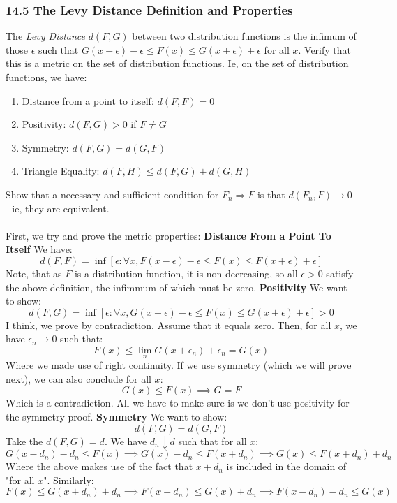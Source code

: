 \documentclass[12pt,a4paper]{article}
\newcommand{\1}[1]{\mathbbm{1}\left\{ #1 \right\}}
\begin{document}
\subsubsection{14.5 The Levy Distance Definition and Properties} The \textit{Levy Distance} $d(F,G)$ between two distribution functions is the infimum of those $\epsilon$ such that $G(x - \epsilon) - \epsilon \leq F(x) \leq G(x + \epsilon) + \epsilon$ for all $x$. Verify that this is a metric on the set of distribution functions. Ie, on the set of distribution functions, we have:
\begin{enumerate}
	\item Distance from a point to itself: $d(F,F) = 0$
	\item Positivity: $d(F,G) > 0$ if $F \neq G$
	\item Symmetry: $d(F,G) = d(G,F)$
	\item Triangle Equality: $d(F,H) \leq d(F,G) + d(G,H)$
\end{enumerate}
Show that a necessary and sufficient condition for $F_n \Rightarrow F$ is that $d(F_n,F) \to 0$ - ie, they are equivalent.
\\\\
First, we try and prove the metric properties: \textbf{Distance From a Point To Itself} We have:
$$
	d(F,F) = \inf\left[\epsilon: \forall x,  F(x - \epsilon) - \epsilon \leq F(x) \leq F(x + \epsilon) + \epsilon\right]
$$
Note, that as $F$ is a distribution function, it is non decreasing, so all $\epsilon > 0$ satisfy the above definition, the infimmum of which must be zero. \textbf{Positivity} We want to show:
$$
	d(F,G) = \inf\left[\epsilon: \forall x, G(x - \epsilon) - \epsilon \leq F(x) \leq G(x + \epsilon) + \epsilon\right] > 0
$$
I think, we prove by contradiction. Assume that it equals zero. Then, for all $x$, we have $\epsilon_n \to 0$ such that:
$$
	F(x) \leq \lim_n G(x + \epsilon_n) + \epsilon_n = G(x)
$$
Where we made use of right continuity. If we use symmetry (which we will prove next), we can also conclude for all $x$:
$$
	G(x) \leq F(x) \implies G = F
$$
Which is a contradiction. All we have to make sure is we don't use positivity for the symmetry proof. \textbf{Symmetry} We want to show:
$$
	d(F,G) = d(G,F) 
$$
Take the $d(F,G) = d$. We have $d_n \downarrow d$ such that for all $x$:
$$
	G(x - d_n) - d_n \leq F(x) \implies
	G(x) - d_n \leq F(x + d_n) \implies G(x) \leq F(x + d_n) + d_n
$$
Where the above makes use of the fact that $x + d_n$ is included in the domain of "for all $x$". Similarly:
$$
	F(x) \leq G(x + d_n) + d_n \implies 
	F(x - d_n) \leq G(x) + d_n \implies F(x - d_n) - d_n \leq G(x)
$$
\end{document}
